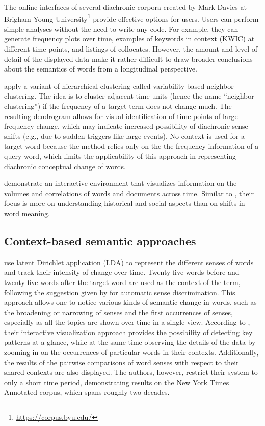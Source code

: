 \documentclass[output=paper]{langsci/langscibook}
\begin{document}
The online interfaces of several diachronic corpora created by Mark Davies at Brigham Young University\footnote{\url{https://corpus.byu.edu/}} provide effective options for users. Users can perform simple analyses without the need to write any code. For example, they can generate frequency plots over time, examples of keywords in context (KWIC) at different time points, and listings of collocates. However, the amount and level of detail  of the displayed data make it rather difficult to draw broader conclusions about the semantics of words from a longitudinal perspective.

\citet{hilpert2008assessing} apply a variant of hierarchical clustering called vari\-abil\-ity-based neighbor clustering. The idea is to cluster adjacent time units (hence the name ``neighbor clustering'') if the frequency of a target term does not change much. The resulting dendrogram allows for visual identification of time points of large frequency change, which may indicate increased possibility of diachronic sense shifts (e.g., due to sudden triggers like large events). No context is used for a target word because the method relies only on the the frequency information of a query word, which limits the applicability of this approach in representing diachronic conceptual change of words.

\citet{odijk2012time} demonstrate an interactive environment that visualizes information on the volumes and correlations of words and documents across time. Similar to \citet{michel2011quantitative}, their focus is more on understanding historical and social aspects than on shifts in word meaning. 

\subsection{Context-based semantic approaches}
\citet{rohrdantz2011towards} use latent Dirichlet application (LDA) to represent the different senses of words and track their intensity of change over time. Twenty-five words before and twenty-five words after the target word are used as the context of the term, following the suggestion given by \citet{schutze1998} for automatic sense discrimination. This approach allows one to notice various kinds of semantic change in words, such as the broadening or narrowing of senses and the first occurrences of senses, especially as all the topics are shown over time in a single view. According to \citet{rohrdantz2011towards}, their interactive visualization approach provides the possibility of detecting key patterns at a glance, while at the same time observing the details of the data by zooming in on the occurrences of particular words in their contexts. Additionally, the results of the pairwise comparisons of word senses with respect to their shared contexts are also displayed. The authors, however, restrict their system to only a short time period, demonstrating results on the New York Times Annotated corpus, which spans roughly two decades. 
\end{document}
